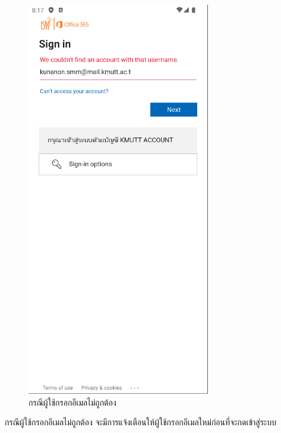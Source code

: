 \documentclass[14pt,oneside,openright,a4paper]{cpe-thai-project}
\begin{document}
\begin{figure}[!h]\centering
  \includegraphics[width=8cm]{./Pictures/Scene2.png}
  \caption{กรณีผู้ใช้กรอกอีเมลไม่ถูกต้อง}\label{fig:EmailWrongTest}
\end{figure}
  \hspace*{1cm} กรณีผู้ใช้กรอกอีเมลไม่ถูกต้อง จะมีการแจ้งเตือนให้ผู้ใช้กรอกอีเมลใหม่ก่อนที่จะกดเข้าสู่ระบบ

\newpage
\end{document}
